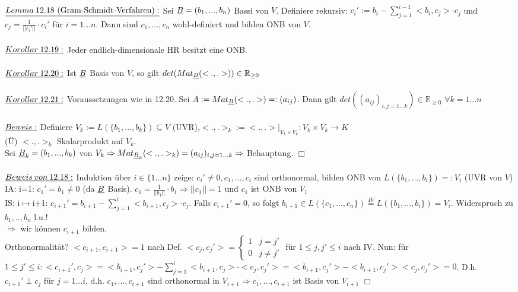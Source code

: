 \documentclass[fleqn, a4paper, 11pt]{article}
\begin{document}
\\
$\uline{Lemma\:12.18\text{ (Gram-Schmidt-Verfahren)}:}$ Sei $\uline{B}=(b_1,...,b_n)$ Bassi von $V$. Definiere rekursiv: $c_i':=b_i-\sum\limits_{j=1}^{i-1} <b_i,c_j>\cdot c_j$ und $c_j=\tfrac{1}{||c_i'||}\cdot c_i'$ f\"ur $i=1...n$. Dann sind $c_1,...,c_n$ wohl-definiert und bilden ONB von $V$.\\
\\
$\uline{Korollar\:12.19:}$ Jeder endlich-dimensionale HR besitzt eine ONB.\\
\\
$\uline{Korollar\:12.20:}$ Ist $\uline{B}$ Basis von $V$, so gilt $det(Mat_{\uline{B}}(<.,.>))\in\mathbb{R}_{\geq 0}$\\
\\
$\uline{Korollar\:12.21:}$ Voraussetzungen wie in 12.20. Sei $A:=Mat_{\uline{B}}(<.,.>)=:(a_{ij})$. Dann gilt $det((a_{ij})_{i,j=1...k})\in\mathbb{R}_{\geq 0}$ $\forall k=1...n$\\
\\
$\uline{Beweis:}$ Definiere $V_k:=L(\{b_1,...,b_k\})\subseteq V$ (UVR),$<.,.>_k :=<.,.>|_{V_k\times V_k}:V_k\times V_k\rightarrow K$\\
(\"U) $<.,.>_k$ Skalarprodukt auf $V_k$.\\
Sei $\uline{B}_k=(b_1,...,b_k)$ von $V_k\Rightarrow Mat_{\uline{B}_k}(<.,.>_k)=(a_{ij})_{i,j=1...k}\Rightarrow$ Behauptung. \hfill $\Box$\\
\\
$\uline{Beweis\:von\:12.18:}$ Induktion \"uber $i\in\{1...n\}$ zeige: $c_i'\neq 0,c_1,...,c_i$ sind orthonormal, bilden ONB von $L(\{b_1,...,b_i\})=:V_i$ (UVR von $V$)\\
IA: i=1: $c_1'=b_1\neq 0$ (da $\uline{B}$ Basis). $c_1=\tfrac{1}{||b_1||}\cdot b_1\Rightarrow ||c_1||=1$ und $c_1$ ist ONB von $V_1$\\
IS: i$\mapsto$i+1: $c_{i+1}'=b_{i+1}-\sum\limits_{j=1}^i <b_{i+1},c_j>\cdot c_j$. Falls $c_{i+1}'=0$, so folgt $b_{i+1}\in L(\{c_1,...,c_n\})\stackrel{IV}{=}L(\{b_1,...,b_i\})=V_i$. Widerspruch zu $b_1,..,b_n$ l.u.!\\
$\Rightarrow$ wir k\"onnen $c_{i+1}$ bilden.\\
Orthonormalit\"at? $<c_{i+1},c_{i+1}>=1$ nach Def. $<c_j,c_j'>=\begin{cases}
	1 & j=j'\\
	0 & j\neq j'
\end{cases}$ f\"ur $1\leq j,j'\leq i$ nach IV. Nun: f\"ur $1\leq j'\leq i:<c_{i+1}',c_j>=<b_{i+1},c_j'>-\sum\limits_{j=1}^i <b_{i+1},c_j>\cdot <c_j,c_j'>=<b_{i+1},c_j'>-<b_{i+1},c_j'><c_j,c_j'>=0$. D.h. $c_{i+1}'\perp c_j$ f\"ur $j=1...i$, d.h. $c_1,...,c_{i+1}$ sind orthonormal in $V_{i+1}\Rightarrow c_1,...,c_{i+1}$ ist Basis von $V_{i+1}$ \hfill $\Box$\\
\end{document}
